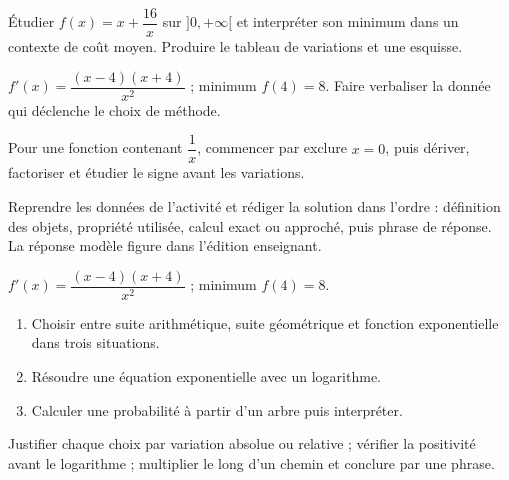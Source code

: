 \begin{activity}
Étudier $f(x)=x+\dfrac{16}{x}$ sur $]0,+\infty[$ et interpréter son minimum dans un contexte de coût moyen. Produire le tableau de variations et une esquisse.
\begin{center}\end{center}
\end{activity}
\begin{solution}$f'(x)=\dfrac{(x-4)(x+4)}{x^2}$ ; minimum $f(4)=8$. Faire verbaliser la donnée qui déclenche le choix de méthode.\end{solution}

\begin{summary}Pour une fonction contenant $\dfrac1x$, commencer par exclure $x=0$, puis dériver, factoriser et étudier le signe avant les variations.\end{summary}

\begin{example}
Reprendre les données de l'activité et rédiger la solution dans l'ordre : définition des objets, propriété utilisée, calcul exact ou approché, puis phrase de réponse. La réponse modèle figure dans l'édition enseignant.
\end{example}
\begin{solution}$f'(x)=\dfrac{(x-4)(x+4)}{x^2}$ ; minimum $f(4)=8$.\end{solution}

\begin{exercise}[essentiel]
\begin{enumerate}\item Choisir entre suite arithmétique, suite géométrique et fonction exponentielle dans trois situations.\item Résoudre une équation exponentielle avec un logarithme.\item Calculer une probabilité à partir d'un arbre puis interpréter.\end{enumerate}
\end{exercise}
\begin{solution}Justifier chaque choix par variation absolue ou relative ; vérifier la positivité avant le logarithme ; multiplier le long d'un chemin et conclure par une phrase.\end{solution}

